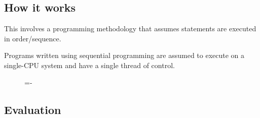 \documentclass[a4paper]{systems-software}
\begin{document}
\subsection*{How it works}

This involves a programming methodology that assumes statements are executed in order/sequence.

Programs written using sequential programming are assumed to execute on a single-CPU system and have a single thread of control.

\begin{figure}[H]
  \lineskip=-\fboxrule
\end{figure}


\subsection*{Evaluation}
\end{document}
